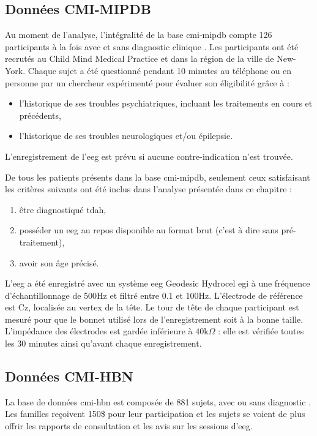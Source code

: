 \subsection{Données CMI-MIPDB}
Au moment de l'analyse, l'intégralité de la base \gls{cmi-mipdb} compte 126 participants à la fois avec et sans diagnostic clinique \citep{Langer2017, Langer2017b}.
Les participants ont été recrutés au Child Mind Medical Practice et dans la région de la ville de New-York. Chaque sujet a été questionné pendant 10 minutes
au téléphone ou en personne par un chercheur expérimenté pour évaluer son éligibilité grâce à :
\begin{itemize}
\item l'historique de ses troubles psychiatriques, incluant les traitements en cours et précédents,
\item l'historique de ses troubles neurologiques et/ou épilepsie.
\end{itemize}

L'enregistrement de l'\gls{eeg} est prévu si aucune contre-indication n'est trouvée. 

De tous les patients présents dans la base \gls{cmi-mipdb}, seulement ceux satisfaisant les critères suivants ont été inclus dans l'analyse présentée dans ce chapitre :
\begin{enumerate}
\item être diagnostiqué \gls{tdah},
\item posséder un \gls{eeg} au repos disponible au format brut (c'est à dire sans pré-traitement),
\item avoir son âge précisé.
\end{enumerate}

L'\gls{eeg} a été enregistré avec un système \gls{eeg} Geodesic Hydrocel \gls{egi} à une fréquence d'échantillonnage de 500Hz et filtré entre 0.1 et 100Hz. 
L'électrode de référence est Cz, localisée au vertex de la tête. Le tour de tête de chaque participant est mesuré pour que le bonnet utilisé lors de l'enregistrement 
soit à la bonne taille. L'impédance des électrodes est gardée inférieure à $40\text{k}\Omega$ : elle est vérifiée toutes les 30 minutes ainsi qu'avant chaque enregistrement.

\subsection{Données CMI-HBN}
La base de données \gls{cmi-hbn} est composée de 881 sujets, avec ou sans diagnostic \citep{Alexander2017, Alexander2017b}. Les familles reçoivent 150\$ pour leur participation 
et les sujets se voient de plus offrir les rapports de consultation et les avis sur les sessions d'\gls{eeg}.

